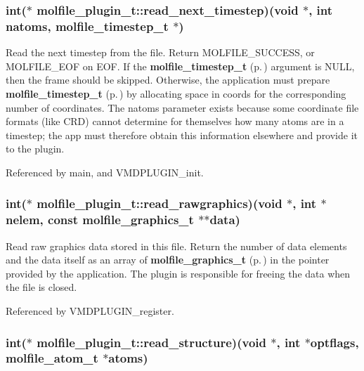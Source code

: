 \subsubsection{\setlength{\rightskip}{0pt plus 5cm}int($\ast$  molfile\_\-plugin\_\-t::read\_\-next\_\-timestep)(void $\ast$, int natoms, {\bf molfile\_\-timestep\_\-t} $\ast$)}\label{structmolfile__plugin__t_m4}


Read the next timestep from the file. Return MOLFILE\_\-SUCCESS, or  MOLFILE\_\-EOF on EOF. If the {\bf molfile\_\-timestep\_\-t} {\rm (p.\,\pageref{structmolfile__timestep__t})} argument is NULL, then  the frame should be skipped. Otherwise, the application must prepare  {\bf molfile\_\-timestep\_\-t} {\rm (p.\,\pageref{structmolfile__timestep__t})} by allocating space in coords for the corresponding  number of coordinates.  The natoms parameter exists because some coordinate file formats  (like CRD) cannot determine for themselves how many atoms are in a  timestep; the app must therefore obtain this information elsewhere and provide it to the plugin. 

Referenced by main, and VMDPLUGIN\_\-init.
\subsubsection{\setlength{\rightskip}{0pt plus 5cm}int($\ast$  molfile\_\-plugin\_\-t::read\_\-rawgraphics)(void $\ast$, int $\ast$nelem, const {\bf molfile\_\-graphics\_\-t} $\ast$$\ast$data)}\label{structmolfile__plugin__t_m12}


Read raw graphics data stored in this file. Return the number of data elements and the data itself as an array of {\bf molfile\_\-graphics\_\-t} {\rm (p.\,\pageref{structmolfile__graphics__t})} in the  pointer provided by the application. The plugin is responsible for  freeing the data when the file is closed. 

Referenced by VMDPLUGIN\_\-register.
\subsubsection{\setlength{\rightskip}{0pt plus 5cm}int($\ast$ molfile\_\-plugin\_\-t::read\_\-structure)(void $\ast$, int $\ast$optflags, {\bf molfile\_\-atom\_\-t} $\ast$atoms)}\label{structmolfile__plugin__t_m2}


